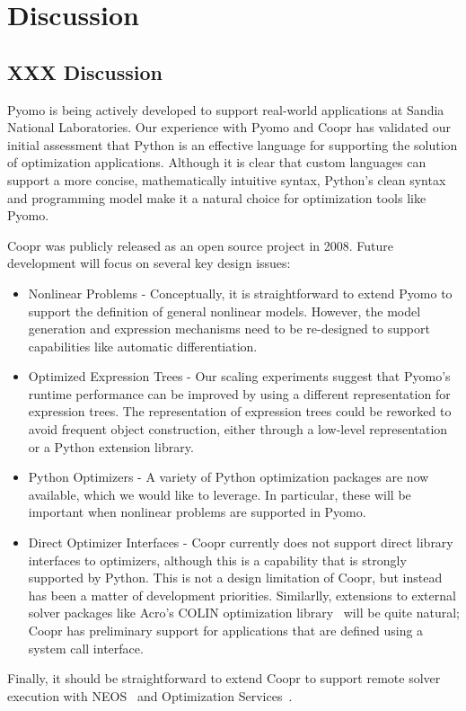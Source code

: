 
\chapter{Discussion}

\section{XXX Discussion}
\label{sec:discussion}

Pyomo is being actively developed to support real-world applications at
Sandia National Laboratories.  Our experience with Pyomo and Coopr has
validated our initial assessment that Python is an effective language for
supporting the solution of optimization applications.  Although it is
clear that custom languages can support a more concise, mathematically
intuitive syntax, Python's clean syntax and programming model make it
a natural choice for optimization tools like Pyomo.

Coopr was publicly released as an open source project in 2008.  Future development will focus on several key design issues:
\begin{itemize}

\item Nonlinear Problems - Conceptually, it is straightforward to extend
Pyomo to support the definition of general nonlinear models.  However,
the model generation and expression mechanisms need to be re-designed
to support capabilities like automatic differentiation.

\item Optimized Expression Trees - Our scaling experiments suggest that 
Pyomo's runtime performance can be improved by using a different 
representation for expression trees.  The representation of expression 
trees could be reworked to avoid frequent object construction, either 
through a low-level representation or a Python extension library.

\item Python Optimizers - A variety of Python optimization packages
are now available, which we would like to leverage.  In particular,
these will be important when nonlinear problems are supported in Pyomo.

\item Direct Optimizer Interfaces - Coopr currently does not support
direct library interfaces to optimizers, although this is a capability
that is strongly supported by Python.  This is not a design limitation
of Coopr, but instead has been a matter of development priorities.
Similarlly, extensions to external solver packages like Acro's COLIN
optimization library~\citep{ACRO} will be quite natural;  Coopr has
preliminary support for applications that are defined using a system
call interface.

\end{itemize}
Finally, it should be straightforward to extend Coopr to support remote
solver execution with NEOS~\citep{NEOS} and Optimization Services~\citep{OS}.

